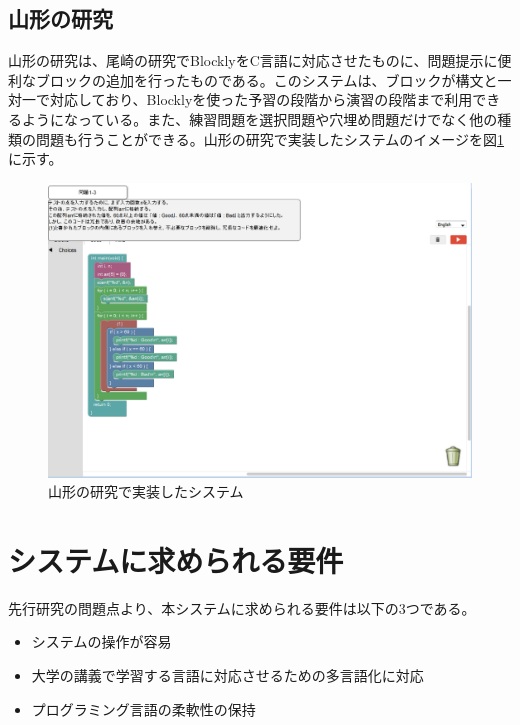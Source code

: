 \documentclass{eniepaper}
\begin{document}
	\subsection{山形の研究}
    
 山形の研究\cite{yamagata}は、尾崎の研究でBlocklyをC言語に対応させたものに、問題提示に便利なブロックの追加を行ったものである。このシステムは、ブロックが構文と一対一で対応しており、Blocklyを使った予習の段階から演習の段階まで利用できるようになっている。また、練習問題を選択問題や穴埋め問題だけでなく他の種類の問題も行うことができる。山形の研究で実装したシステムのイメージを図\ref{fig:yamagata}に示す。 
 
\begin{figure}[h]
\begin{center}
\includegraphics[scale=0.4]{img/yamagata.eps}
\caption{山形の研究で実装したシステム}%
\label{fig:yamagata}
\end{center}%
\end{figure}%
 
    \section{システムに求められる要件}
    
先行研究の問題点より、本システムに求められる要件は以下の3つである。
 
\begin{itemize}
\item システムの操作が容易
\item 大学の講義で学習する言語に対応させるための多言語化に対応
\item プログラミング言語の柔軟性の保持
\end{itemize} 
\end{document}
